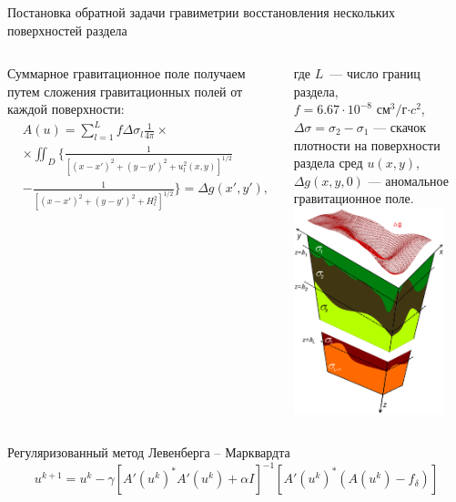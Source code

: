 \documentclass[10pt,pdf, mathserif, hyperref={unicode}]{beamer}
\begin{document}

\begin{frame}{Постановка обратной задачи гравиметрии восстановления нескольких поверхностей раздела}
	\begin{columns}
	Суммарное гравитационное поле получаем путем сложения гравитационных полей от каждой поверхности:
	\begin{equation*}
	\begin{aligned}
	& A(u)=\sum_{l=1}^{L}f\Delta\sigma_l\frac{1}{4\pi}\times \\
&\times\iint_D\bigg\{\frac{1}{[(x-x')^2+(y-y')^2+u_l^2(x,y)]^{1/2}} \\
	&-\frac{1}{[(x-x')^2+(y-y')^2+H_l^2]^{1/2}}\bigg\}=\Delta g(x',y'),
	\end{aligned}
	\end{equation*}

	где $L$~--- число границ раздела, \\ 
	$f=6.67\cdot10^{-8}$ см$^3/$г$\cdot c^2$, $\Delta\sigma=\sigma_2-\sigma_1$ --- скачок плотности на поверхности раздела сред $u(x,y)$, $\Delta g(x,y,0)$ --- аномальное гравитационное поле.
		\centering
		\includegraphics[height=6.0cm]{whitegrav.png}
		\label{fig:multlayer}
\end{columns}

	Регуляризованный метод Левенберга -- Марквардта %
	$$	u^{k+1}=u^k-\gamma[A'(u^k)^*A'(u^k)+\alpha I]^{-1} [A'(u^k)^*(A(u^k)-f_\delta)]$$
\end{frame}
\end{document}
